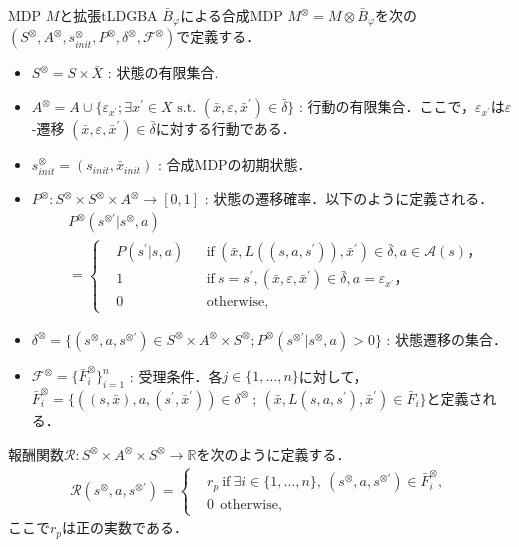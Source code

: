 \documentclass[a4j,9pt,twocolumn]{jsarticle}
\theoremstyle{definition}
\begin{document}
MDP $M$と拡張tLDGBA $\bar{B}_{\varphi}$による合成MDP $M^{\otimes} = M \otimes \bar{B}_{\varphi}$を次の$(S^{\otimes}, A^{\otimes}, s_{init}^{\otimes}, P^{\otimes}, \delta^{\otimes}, {\mathcal F}^{\otimes})$で定義する．
\begin{itemize}
  \item $S^{\otimes} = S \times \bar{X}$ : 状態の有限集合.
  \item $A^{\otimes}=A \cup \{ \varepsilon_{x^{\prime}} ; \exists x^{\prime}\! \in \! X \text{ s.t. } (\bar{x}, \varepsilon, \bar{x}^{\prime})\! \in \! \bar{\delta} \}$ : 行動の有限集合．ここで，$\varepsilon_{x^{\prime}}$は$\varepsilon$-遷移 $(\bar{x}, \varepsilon, \bar{x}^{\prime})\! \in \! \bar{\delta}$に対する行動である．
  \item $s^{\otimes}_{init} = (s_{init},\bar{x}_{init})$ : 合成MDPの初期状態．
  \item $P^{\otimes} : S^{\otimes} \times S^{\otimes} \times A^{\otimes} \to [0,1] $ : 状態の遷移確率．以下のように定義される．
  \begin{align}
    &P^{\otimes}(s^{\otimes \prime} | s^{\otimes}, a) \nonumber \\
    &=
    \left\{
    \begin{aligned}
      &P(s^{\prime} | s, a) &   &\text{if}\  (\bar{x}, L((s,a,s^{\prime})), \bar{x}^{\prime}) \in \bar{\delta}, a \in \mathcal{A}(s)，\\
      &1 &   &\text{if}\ s\!=\!s^{\prime}, (\bar{x}, \varepsilon, \bar{x}^{\prime})\! \in \! \bar{\delta}, a=\varepsilon_{x^{\prime}}，\\
      &0 &   &\text{otherwise},
    \end{aligned}
    \right. \nonumber
  \end{align}
  \item $\delta^{\otimes}  = \{ (s^{\otimes}, a, s^{\otimes \prime}) \in S^{\otimes} \times A^{\otimes} \times S^{\otimes} ; P^{\otimes}(s^{\otimes \prime} | s^{\otimes}, a) > 0 \} $ : 状態遷移の集合．
  \item $\mathcal{F}^{\otimes} = \{ \bar{F}^{\otimes}_i \} _{i=1}^{n}$ : 受理条件．各$j \in \{ 1,\ldots,n \}$に対して，$\bar{F}^{\otimes}_i = \{ ((s,\bar{x}), a, (s^{\prime}, \bar{x}^{\prime})) \in \delta^{\otimes}\ ;\ (\bar{x}, L(s,a,s^{\prime}), \bar{x}^{\prime}) \in \bar{F}_i \}$と定義される．
\end{itemize}
報酬関数$\mathcal{R} :S^{\otimes} \times A^{\otimes} \times S^{\otimes} \rightarrow {\mathbb R}$を次のように定義する．
\begin{align}
    \mathcal{R}(s^{\otimes}, a, s^{\otimes \prime}) =
    \left\{
    \begin{aligned}
      &r_p \  \text{if}\ \exists i \in \! \{ 1, \ldots ,n \},\ (s^{\otimes}, a, s^{\otimes \prime}) \in \bar{F}^{\otimes}_i \!,\\
      &0   \ \ \text{otherwise},
    \end{aligned}
    \right.
  \label{reward}
  \end{align}
ここで$r_p$は正の実数である．
\end{document}
